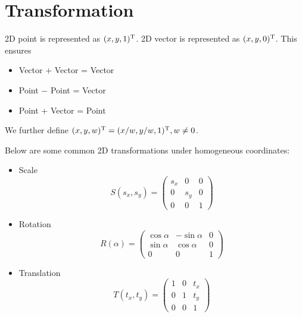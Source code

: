 
% 



\section{Transformation}

2D point is represented as $(x, y, 1)^\mathrm{T}$. 2D vector is represented as $(x, y, 0)^\mathrm{T}$. This ensures

\begin{itemize}
    \item Vector + Vector = Vector
    \item Point $-$ Point = Vector
    \item Point + Vector = Point
\end{itemize}

We further define $(x, y, w)^\mathrm{T} = (x/w, y/w, 1)^\mathrm{T}, w\ne 0$.

Below are some common 2D transformations under homogeneous coordinates:

\begin{itemize}
    \item Scale
    $$S(s_x, s_y) = \begin{pmatrix}
        s_x & 0 & 0 \\
        0 & s_y & 0 \\
        0 & 0 & 1
    \end{pmatrix}$$
    \item Rotation
    $$R(\alpha) = \begin{pmatrix}
        \cos\alpha & -\sin\alpha & 0 \\
        \sin\alpha & \cos\alpha & 0 \\
        0 & 0 & 1
    \end{pmatrix}$$
    \item Translation
    $$T(t_x, t_y) = \begin{pmatrix}
        1 & 0 & t_x \\
        0 & 1 & t_y \\
        0 & 0 & 1
    \end{pmatrix}$$
\end{itemize}

% 
